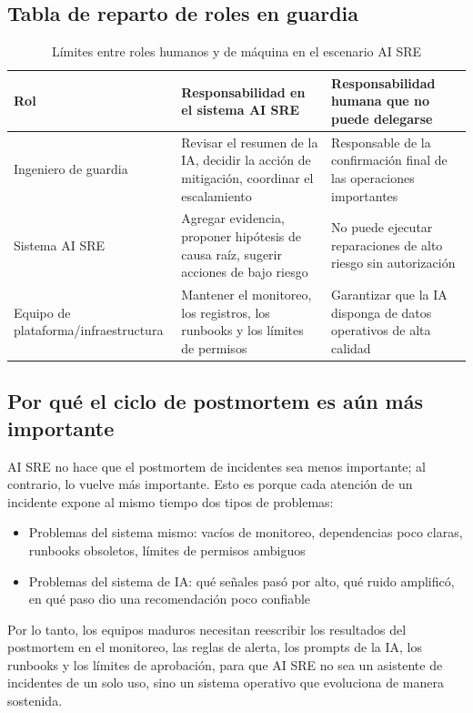 \subsection{Tabla de reparto de roles en guardia}

\begin{table}[H]
\centering
\begin{tabular}{p{} p{} p{}}
\toprule
Rol & Responsabilidad en el sistema AI SRE & Responsabilidad humana que no puede delegarse \\
\midrule
Ingeniero de guardia & Revisar el resumen de la IA, decidir la acción de mitigación, coordinar el escalamiento & Responsable de la confirmación final de las operaciones importantes \\
Sistema AI SRE & Agregar evidencia, proponer hipótesis de causa raíz, sugerir acciones de bajo riesgo & No puede ejecutar reparaciones de alto riesgo sin autorización \\
Equipo de plataforma/infraestructura & Mantener el monitoreo, los registros, los runbooks y los límites de permisos & Garantizar que la IA disponga de datos operativos de alta calidad \\
\bottomrule
\end{tabular}
\caption{Límites entre roles humanos y de máquina en el escenario AI SRE}
\end{table}

\subsection{Por qué el ciclo de postmortem es aún más importante}

AI SRE no hace que el postmortem de incidentes sea menos importante; al contrario, lo vuelve más importante. Esto es porque cada atención de un incidente expone al mismo tiempo dos tipos de problemas:

\begin{itemize}
    \item Problemas del sistema mismo: vacíos de monitoreo, dependencias poco claras, runbooks obsoletos, límites de permisos ambiguos
    \item Problemas del sistema de IA: qué señales pasó por alto, qué ruido amplificó, en qué paso dio una recomendación poco confiable
\end{itemize}

Por lo tanto, los equipos maduros necesitan reescribir los resultados del postmortem en el monitoreo, las reglas de alerta, los prompts de la IA, los runbooks y los límites de aprobación, para que AI SRE no sea un asistente de incidentes de un solo uso, sino un sistema operativo que evoluciona de manera sostenida.


